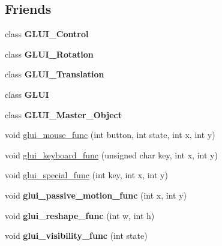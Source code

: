 \subsection*{Friends}
\begin{DoxyCompactItemize}
\item 
\hypertarget{classGLUI__Main_a1ac6a21915ff78bdda7d92427b2b9337}{class {\bfseries G\-L\-U\-I\-\_\-\-Control}}\label{classGLUI__Main_a1ac6a21915ff78bdda7d92427b2b9337}

\item 
\hypertarget{classGLUI__Main_a7f68b21cd9d98467322b20fd2d4c739c}{class {\bfseries G\-L\-U\-I\-\_\-\-Rotation}}\label{classGLUI__Main_a7f68b21cd9d98467322b20fd2d4c739c}

\item 
\hypertarget{classGLUI__Main_a1c751e686f087581ee115c051b63e3ff}{class {\bfseries G\-L\-U\-I\-\_\-\-Translation}}\label{classGLUI__Main_a1c751e686f087581ee115c051b63e3ff}

\item 
\hypertarget{classGLUI__Main_a8b2353bef6e8c665a923971433c0c999}{class {\bfseries G\-L\-U\-I}}\label{classGLUI__Main_a8b2353bef6e8c665a923971433c0c999}

\item 
\hypertarget{classGLUI__Main_a89d3c98d28cb65cd25c91f17ffcd2bdf}{class {\bfseries G\-L\-U\-I\-\_\-\-Master\-\_\-\-Object}}\label{classGLUI__Main_a89d3c98d28cb65cd25c91f17ffcd2bdf}

\item 
void \hyperlink{classGLUI__Main_a6385df2c931519beca286ede9e098f96}{glui\-\_\-mouse\-\_\-func} (int button, int state, int x, int y)
\item 
void \hyperlink{classGLUI__Main_ae3390518e45a04617135f564021bcebf}{glui\-\_\-keyboard\-\_\-func} (unsigned char key, int x, int y)
\item 
void \hyperlink{classGLUI__Main_a457caba107a71dff1918cb7dd271e8f1}{glui\-\_\-special\-\_\-func} (int key, int x, int y)
\item 
\hypertarget{classGLUI__Main_a783f2a1497c9cc9e2f8c45244c20cc5e}{void {\bfseries glui\-\_\-passive\-\_\-motion\-\_\-func} (int x, int y)}\label{classGLUI__Main_a783f2a1497c9cc9e2f8c45244c20cc5e}

\item 
\hypertarget{classGLUI__Main_a1798681d4deaa39c807e49c3902fde96}{void {\bfseries glui\-\_\-reshape\-\_\-func} (int w, int h)}\label{classGLUI__Main_a1798681d4deaa39c807e49c3902fde96}

\item 
\hypertarget{classGLUI__Main_a98726addbd2797b8134ac2b654c3cee6}{void {\bfseries glui\-\_\-visibility\-\_\-func} (int state)}\label{classGLUI__Main_a98726addbd2797b8134ac2b654c3cee6}


\end{DoxyCompactItemize}
